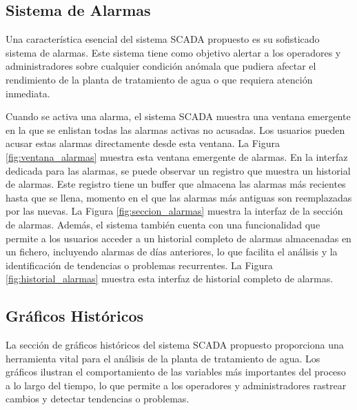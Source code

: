 \subsection{Sistema de Alarmas}

Una característica esencial del sistema SCADA propuesto es su sofisticado sistema de alarmas. Este sistema tiene como objetivo alertar a los operadores y administradores sobre cualquier condición anómala que pudiera afectar el rendimiento de la planta de tratamiento de agua o que requiera atención inmediata.

Cuando se activa una alarma, el sistema SCADA muestra una ventana emergente en la que se enlistan todas las alarmas activas no acusadas. Los usuarios pueden acusar estas alarmas directamente desde esta ventana. La Figura \ref{fig:ventana_alarmas} muestra esta ventana emergente de alarmas.
En la interfaz dedicada para las alarmas, se puede observar un registro que muestra un historial de alarmas. Este registro tiene un buffer que almacena las alarmas más recientes hasta que se llena, momento en el que las alarmas más antiguas son reemplazadas por las nuevas. La Figura \ref{fig:seccion_alarmas} muestra la interfaz de la sección de alarmas.
Además, el sistema también cuenta con una funcionalidad que permite a los usuarios acceder a un historial completo de alarmas almacenadas en un fichero, incluyendo alarmas de días anteriores, lo que facilita el análisis y la identificación de tendencias o problemas recurrentes. La Figura \ref{fig:historial_alarmas} muestra esta interfaz de historial completo de alarmas.



\subsection{Gráficos Históricos}

La sección de gráficos históricos del sistema SCADA propuesto proporciona una herramienta vital para el análisis de la planta de tratamiento de agua. Los gráficos ilustran el comportamiento de las variables más importantes del proceso a lo largo del tiempo, lo que permite a los operadores y administradores rastrear cambios y detectar tendencias o problemas.

